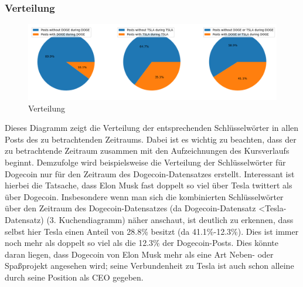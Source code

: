 \documentclass{article}
\begin{document}
\subsubsection{Verteilung}
\begin{figure}[h]
  	\centering
  	\includegraphics[width=\textwidth]{../imgs/Verteilung.png}
 	\caption{Verteilung}
 	\label{fig:Verteilung}
\end{figure}
Dieses Diagramm zeigt die Verteilung der entsprechenden Schlüsselwörter in allen Posts des zu betrachtenden Zeitraums.
Dabei ist es wichtig zu beachten, dass der zu betrachtende Zeitraum zusammen mit den Aufzeichnungen des Kursverlaufs beginnt.
Demzufolge wird beispielsweise die Verteilung der Schlüsselwörter für Dogecoin nur für den Zeitraum des Dogecoin-Datensatzes erstellt.
Interessant ist hierbei die Tatsache, dass Elon Musk fast doppelt so viel über Tesla twittert als über Dogecoin.
Insbesondere wenn man sich die kombinierten Schlüsselwörter über den Zeitraum des Dogecoin-Datensatzes (da Dogecoin-Datensatz \textless Tesla-Datensatz) (3. Kuchendiagramm) näher anschaut, ist deutlich zu erkennen, dass selbst hier Tesla einen Anteil von 28.8\% besitzt (da 41.1\%-12.3\%).
Dies ist immer noch mehr als doppelt so viel als die 12.3\% der Dogecoin-Posts.
Dies könnte daran liegen, dass Dogecoin von Elon Musk mehr als eine Art Neben- oder Spaßprojekt angesehen wird; seine Verbundenheit zu Tesla ist auch schon alleine durch seine Position als CEO gegeben.
\end{document}
